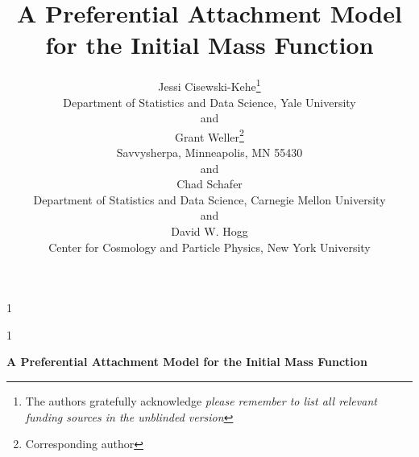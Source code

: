\documentclass[12pt]{article}
\newcommand{\blind}{1}
\begin{document}
\def\spacingset#1{\renewcommand{\baselinestretch}%
{#1}\small\normalsize} \spacingset{1}





\blind
{
  \title{\bf A Preferential Attachment Model for the Initial Mass Function}
  \author{Jessi Cisewski-Kehe\thanks{
    The authors gratefully acknowledge \textit{please remember to list all relevant funding sources in the unblinded version}}\hspace{.2cm}\\
    Department of Statistics and Data Science, Yale University\\
    and \\
    Grant Weller\thanks{
    Corresponding author}\hspace{.2cm}\\
  Savvysherpa, Minneapolis, MN 55430 \\
    and \\
    Chad Schafer \\
    Department of Statistics and Data Science, Carnegie Mellon University \\
        and \\
    David W. Hogg \\
    Center for Cosmology and Particle Physics, New York University 
    }
  \maketitle
} \fi

\blind
{
  \bigskip
  \bigskip
  \bigskip
  \begin{center}
    {\LARGE\bf A Preferential Attachment Model for the Initial Mass Function}
\end{center}
  \medskip
} \fi
\end{document}
